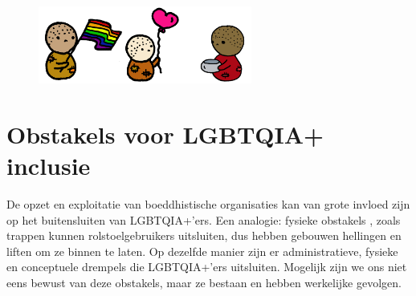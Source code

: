 \documentclass[12pt,openany]{book}
\begin{document}
\begin{figure}[h]
\includegraphics[width=7cm]{13.png}
\centering
\end{figure}

\begin{figure}
    \centering
\end{figure}

\chapter*{Obstakels voor LGBTQIA+ inclusie}

De opzet en exploitatie van boeddhistische organisaties kan van grote invloed zijn op het buitensluiten van LGBTQIA+’ers. Een analogie: fysieke obstakels , zoals trappen kunnen rolstoelgebruikers uitsluiten, dus hebben gebouwen hellingen en liften om ze binnen te laten. Op dezelfde manier zijn er administratieve, fysieke en conceptuele drempels die LGBTQIA+’ers uitsluiten. Mogelijk zijn we ons niet eens bewust van deze obstakels, maar ze bestaan en hebben werkelijke gevolgen.
\end{document}
